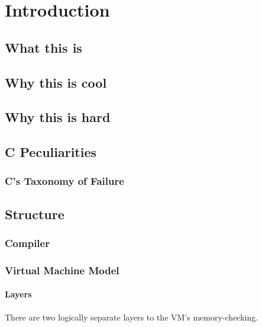 \documentclass[a4paper]{report}
\begin{document}
\tableofcontents

\chapter{Introduction}

\section{What this is}

\section{Why this is cool}

\section{Why this is hard}

\section{C Peculiarities}
\subsection{C's Taxonomy of Failure}


\section{Structure}
\subsection{Compiler}
\subsection{Virtual Machine Model}
\subsubsection{Layers}
There are two logically separate layers to the VM's memory-checking.
\end{document}

